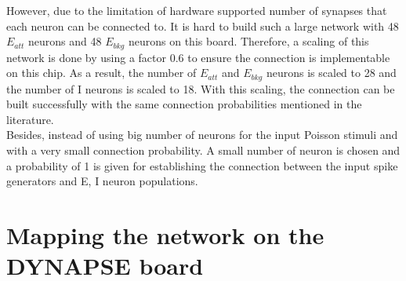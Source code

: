 However, due to the limitation of hardware supported number of synapses that each neuron can be connected to. It is hard to build such a large network with 48 $E_{att}$ neurons and 48 $E_{bkg}$ neurons on this board. Therefore, a scaling of this network is done by using a factor 0.6 to ensure the connection is implementable on this chip.
As a result, the number of $E_{att}$ and $E_{bkg}$ neurons is scaled to 28 and the number of I neurons is scaled to 18. With this scaling, the connection can be built successfully with the same connection probabilities mentioned in the literature.\\

Besides, instead of using big number of neurons for the input Poisson stimuli and with a very small connection probability. A small number of neuron is chosen and a probability of 1 is given for establishing the connection between the input spike generators and E, I neuron populations.

\section{Mapping the network on the DYNAPSE board}

